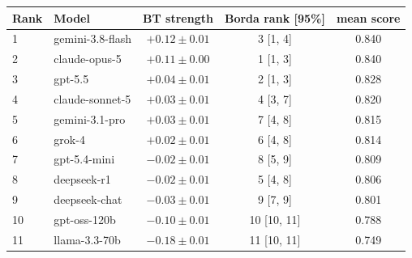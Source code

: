 \begin{tabular}{llccc}
\toprule
Rank & Model & BT strength & Borda rank [95\%] & mean score \\
\midrule
1 & gemini-3.8-flash & $+0.12 \pm 0.01$ & 3 [1, 4] & 0.840 \\
2 & claude-opus-5 & $+0.11 \pm 0.00$ & 1 [1, 3] & 0.840 \\
3 & gpt-5.5 & $+0.04 \pm 0.01$ & 2 [1, 3] & 0.828 \\
4 & claude-sonnet-5 & $+0.03 \pm 0.01$ & 4 [3, 7] & 0.820 \\
5 & gemini-3.1-pro & $+0.03 \pm 0.01$ & 7 [4, 8] & 0.815 \\
6 & grok-4 & $+0.02 \pm 0.01$ & 6 [4, 8] & 0.814 \\
7 & gpt-5.4-mini & $-0.02 \pm 0.01$ & 8 [5, 9] & 0.809 \\
8 & deepseek-r1 & $-0.02 \pm 0.01$ & 5 [4, 8] & 0.806 \\
9 & deepseek-chat & $-0.03 \pm 0.01$ & 9 [7, 9] & 0.801 \\
10 & gpt-oss-120b & $-0.10 \pm 0.01$ & 10 [10, 11] & 0.788 \\
11 & llama-3.3-70b & $-0.18 \pm 0.01$ & 11 [10, 11] & 0.749 \\
\bottomrule
\end{tabular}
